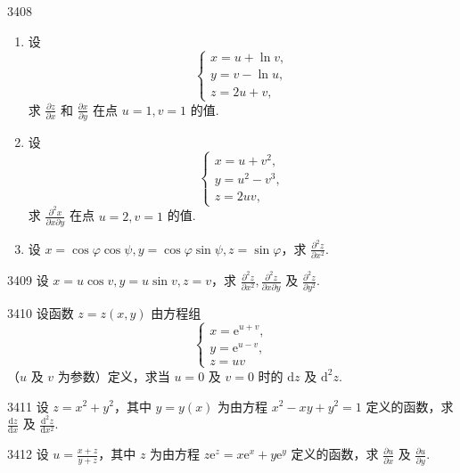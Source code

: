\begin{prob}[L]{3408}
\begin{enumerate}[label=(\alph*), itemsep=2pt, topsep=3pt]
\item 设
\[
\begin{cases}
x = u + \ln v, \\
y = v - \ln u, \\
z = 2u + v,
\end{cases}
\]
求 $\frac{\partial z}{\partial x}$ 和 $\frac{\partial x}{\partial y}$ 在点 $u = 1, v = 1$ 的值.
\item 设
\[
\begin{cases}
x = u + v^2, \\
y = u^2 - v^3, \\
z = 2uv,
\end{cases}
\]
求 $\frac{\partial^2 x}{\partial x \partial y}$ 在点 $u = 2, v = 1$ 的值.
\item 设 $x = \cos\varphi\cos\psi, y = \cos\varphi\sin\psi, z = \sin\varphi$，求 $\frac{\partial^2 z}{\partial x^2}$.
\end{enumerate}
\end{prob}

\begin{prob}[S]{3409}
设 $x = u\cos v, y = u\sin v, z = v$，求 $\frac{\partial^2 z}{\partial x^2}, \frac{\partial^2 z}{\partial x\partial y}$ 及 $\frac{\partial^2 z}{\partial y^2}$.
\end{prob}

\begin{prob}[M]{3410}
设函数 $z = z(x, y)$ 由方程组
\[
\begin{cases}
x = \mathrm{e}^{u+v}, \\
y = \mathrm{e}^{u-v}, \\
z = uv
\end{cases}
\]
（$u$ 及 $v$ 为参数）定义，求当 $u = 0$ 及 $v = 0$ 时的 $\mathrm{d}z$ 及 $\mathrm{d}^2 z$.
\end{prob}

\begin{prob}[S]{3411}
设 $z = x^2 + y^2$，其中 $y = y(x)$ 为由方程 $x^2 - xy + y^2 = 1$ 定义的函数，求 $\frac{\mathrm{d}z}{\mathrm{d}x}$ 及 $\frac{\mathrm{d}^2 z}{\mathrm{d}x^2}$.
\end{prob}

\begin{prob}[S]{3412}
设 $u = \frac{x+z}{y+z}$，其中 $z$ 为由方程 $z\mathrm{e}^z = x\mathrm{e}^x + y\mathrm{e}^y$ 定义的函数，求 $\frac{\partial u}{\partial x}$ 及 $\frac{\partial u}{\partial y}$.
\end{prob}

